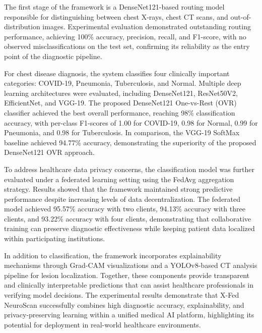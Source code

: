 \documentclass[openany, 12pt]{book}
\begin{document}
{			The first stage of the framework is a DenseNet121-based routing model responsible for distinguishing between chest X-rays, chest CT scans, and out-of-distribution images. Experimental evaluation demonstrated outstanding routing performance, achieving 100\% accuracy, precision, recall, and F1-score, with no observed misclassifications on the test set, confirming its reliability as the entry point of the diagnostic pipeline.
			
			For chest disease diagnosis, the system classifies four clinically important categories: COVID-19, Pneumonia, Tuberculosis, and Normal. Multiple deep learning architectures were evaluated, including DenseNet121, ResNet50V2, EfficientNet, and VGG-19. The proposed DenseNet121 One-vs-Rest (OVR) classifier achieved the best overall performance, reaching 98\% classification accuracy, with per-class F1-scores of 1.00 for COVID-19, 0.98 for Normal, 0.99 for Pneumonia, and 0.98 for Tuberculosis. In comparison, the VGG-19 SoftMax baseline achieved 94.77\% accuracy, demonstrating the superiority of the proposed DenseNet121 OVR approach.
			
			To address healthcare data privacy concerns, the classification model was further evaluated under a federated learning setting using the FedAvg aggregation strategy. Results showed that the framework maintained strong predictive performance despite increasing levels of data decentralization. The federated model achieved 95.57\% accuracy with two clients, 94.13\% accuracy with three clients, and 93.22\% accuracy with four clients, demonstrating that collaborative training can preserve diagnostic effectiveness while keeping patient data localized within participating institutions.
			
			In addition to classification, the framework incorporates explainability mechanisms through Grad-CAM visualizations and a YOLOv8-based CT analysis pipeline for lesion localization. Together, these components provide transparent and clinically interpretable predictions that can assist healthcare professionals in verifying model decisions. The experimental results demonstrate that X-Fed NeuroScan successfully combines high diagnostic accuracy, explainability, and privacy-preserving learning within a unified medical AI platform, highlighting its potential for deployment in real-world healthcare environments.
		
	}
	\newpage
	\tableofcontents
	\newpage
	\listoftables
	\newpage
	\listoffigures
	\newpage
	
\end{document}

